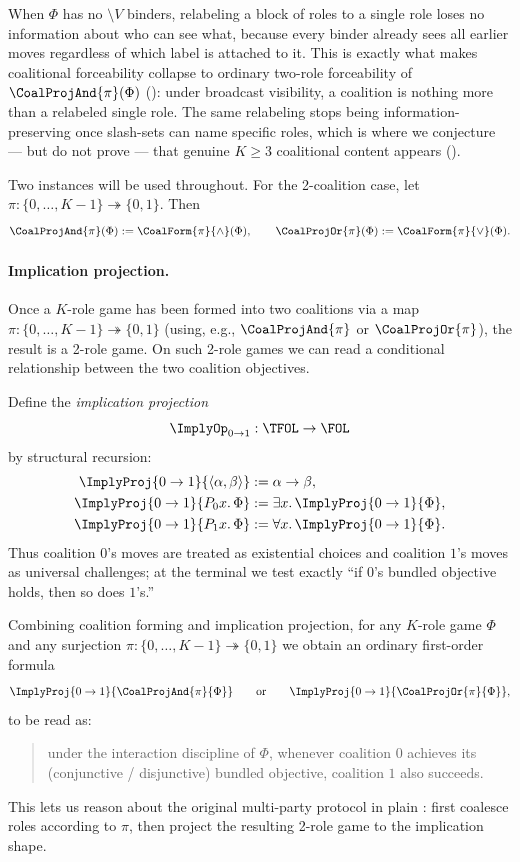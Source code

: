 \begin{remark}
\label{rem:merge-lossless-forward}
When $\Phi$ has no $\setminus V$ binders, relabeling a block of roles to a
single role loses no information about who can see what, because every binder
already sees all earlier moves regardless of which label is attached to it.
This is exactly what makes coalitional forceability collapse to ordinary
two-role forceability of $\CoalProjAnd{\pi}(\Phi)$
(): under broadcast visibility, a
coalition is nothing more than a relabeled single role. The same relabeling
stops being information-preserving once slash-sets can name specific roles,
which is where we conjecture --- but do not prove --- that genuine
$K\ge 3$ coalitional content appears
().
\end{remark}

Two instances will be used throughout. For the 2-coalition case, let
$\pi : \{0,\dots,K-1\} \twoheadrightarrow \{0,1\}$.
Then
\[
  \CoalProjAnd{\pi}(\Phi) := \CoalForm{\pi}{\wedge}(\Phi),
  \qquad
  \CoalProjOr{\pi}(\Phi)  := \CoalForm{\pi}{\vee}(\Phi).
\]
\paragraph{Implication projection.}
Once a $K$-role game has been formed into two coalitions via a map
$\pi : \{0,\dots,K-1\} \twoheadrightarrow \{0,1\}$ (using, e.g.,
$\CoalProjAnd{\pi}$ or $\CoalProjOr{\pi}$), the result is a 2-role game.
On such 2-role games we can read a conditional relationship between the
two coalition objectives.

Define the \emph{implication projection}
\[
  \ImplyOp_{0 \to 1} : \TFOL \to \FOL
\]
by structural recursion:
\[
\begin{aligned}
\ImplyProj{0 \to 1}{\langle \alpha,\beta\rangle}
  &:= \alpha \to \beta,\\
\ImplyProj{0 \to 1}{P_0 x.\,\Phi}
  &:= \exists x.\,\ImplyProj{0 \to 1}{\Phi},\\
\ImplyProj{0 \to 1}{P_1 x.\,\Phi}
  &:= \forall x.\,\ImplyProj{0 \to 1}{\Phi}.
\end{aligned}
\]
Thus coalition $0$'s moves are treated as existential choices and coalition
$1$'s moves as universal challenges; at the terminal we test exactly
``if $0$'s bundled objective holds, then so does $1$'s.''

Combining coalition forming and implication projection, for any
$K$-role game $\Phi$ and any surjection
$\pi : \{0,\dots,K-1\} \twoheadrightarrow \{0,1\}$ we obtain an ordinary
first-order formula
\[
  \ImplyProj{0 \to 1}{\CoalProjAnd{\pi}{\Phi}}
  \qquad\text{or}\qquad
  \ImplyProj{0 \to 1}{\CoalProjOr{\pi}{\Phi}},
\]
to be read as:
\begin{quote}
  under the interaction discipline of $\Phi$, whenever coalition $0$
  achieves its (conjunctive / disjunctive) bundled objective, coalition $1$
  also succeeds.
\end{quote}
This lets us reason about the original multi-party protocol in plain \FOL:
first coalesce roles according to $\pi$, then project the resulting 2-role
game to the implication shape.

